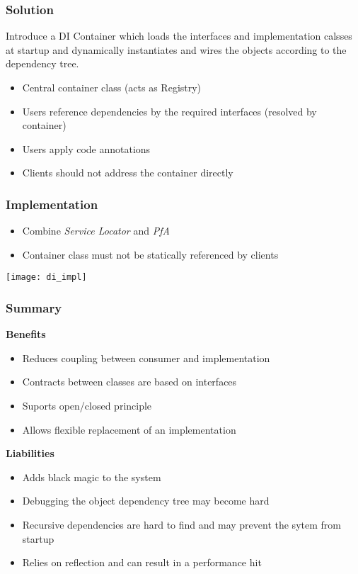 \subsubsection{Solution}
Introduce a DI Container which loads the interfaces and implementation calsses at startup and dynamically instantiates and wires the objects according to the dependency tree.
\begin{itemize}[topsep=0pt]
    \itemsep -0.4em
    \item Central container class (acts as Registry)
    \item Users reference dependencies by the required interfaces (resolved by container)
    \item Users apply code annotations
    \item Clients should not address the container directly
\end{itemize}
\subsubsection{Implementation}
\begin{itemize}[topsep=0pt]
    \itemsep -0.4em
    \item Combine \textit{Service Locator} and \textit{PfA}
    \item Container class must not be statically referenced by clients
\end{itemize}
\texttt{[image: di\_impl]}
\subsubsection{Summary}
\textbf{Benefits}
\begin{itemize}[topsep=0pt]
    \itemsep -0.4em
    \item Reduces coupling between consumer and implementation
    \item Contracts between classes are based on interfaces
    \item Suports open/closed principle
    \item Allows flexible replacement of an implementation
\end{itemize}
\textbf{Liabilities}
\begin{itemize}[topsep=0pt]
    \itemsep -0.4em
    \item Adds black magic to the system
    \item Debugging the object dependency tree may become hard
    \item Recursive dependencies are hard to find and may prevent the sytem from startup
    \item Relies on reflection and can result in a performance hit
\end{itemize}
